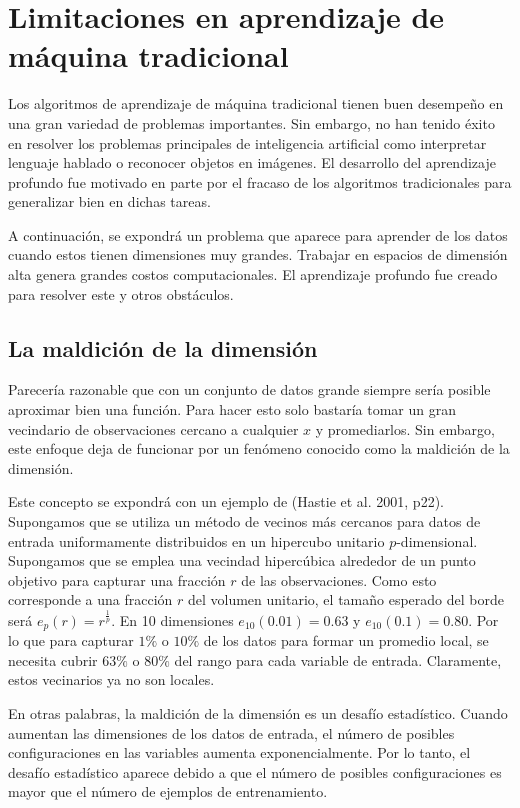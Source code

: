 \section{Limitaciones en aprendizaje de máquina tradicional}
Los algoritmos de aprendizaje de máquina tradicional tienen buen desempeño en una gran variedad de problemas importantes. Sin embargo, no han tenido éxito en resolver los problemas principales de inteligencia artificial como interpretar lenguaje hablado o reconocer objetos en imágenes. El desarrollo del aprendizaje profundo fue motivado en parte por el fracaso de los algoritmos tradicionales para generalizar bien en dichas tareas.

\vspace{1em}

A continuación, se expondrá un problema que aparece para aprender de los datos cuando estos tienen dimensiones muy grandes. Trabajar en espacios de dimensión alta genera grandes costos computacionales. El aprendizaje profundo fue creado para resolver este y otros obstáculos.
\cite{goodfellow-et-al-2016}

\subsection{La maldición de la dimensión}
Parecería razonable que con un conjunto de datos grande siempre sería posible aproximar bien una función. Para hacer esto solo bastaría tomar un gran vecindario de observaciones cercano a cualquier $x$ y promediarlos. Sin embargo, este enfoque deja de funcionar por un fenómeno conocido como la maldición de la dimensión.
\cite{Bishop:2006:PRM:1162264}
\cite{hastie01statisticallearning}
\cite{Murphy:2012:MLP:2380985}

\vspace{1em}

Este concepto se expondrá con un ejemplo de (Hastie et al. 2001, p22). Supongamos que se utiliza un método de vecinos más cercanos para datos de entrada uniformamente distribuidos en un hipercubo unitario $p$-dimensional. Supongamos que se emplea una vecindad hipercúbica alrededor de un punto objetivo para capturar una fracción $r$ de las observaciones. Como esto corresponde a una fracción $r$ del volumen unitario, el tamaño esperado del borde será $e_p(r) = r^{\frac{1}{p}}$. En 10 dimensiones $e_10(0.01)=0.63$ y $e_10(0.1) = 0.80$. Por lo que para capturar $1\%$ o $10\%$ de los datos para formar un promedio local, se necesita cubrir $63\%$ o $80\%$ del rango para cada variable de entrada. Claramente, estos vecinarios ya no son locales. \cite{hastie01statisticallearning}

\vspace{1em}

En otras palabras, la maldición de la dimensión es un desafío estadístico. Cuando aumentan las dimensiones de los datos de entrada, el número de posibles configuraciones en las variables aumenta exponencialmente. Por lo tanto, el desafío estadístico aparece debido a que el número de posibles configuraciones es mayor que el número de ejemplos de entrenamiento.
\cite{goodfellow-et-al-2016}

